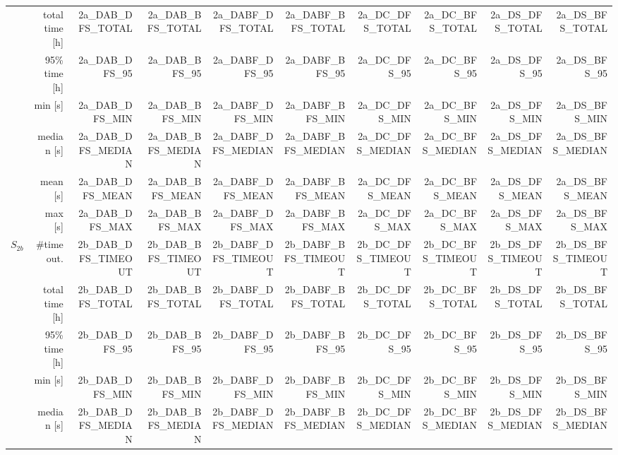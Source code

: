 \begin{table}
{\begin{tabular}{|l|r|r|r|r|r|r|r|r|r|}
                      & total time [h] & 2a_DAB_DFS_TOTAL   & 2a_DAB_BFS_TOTAL   & 2a_DABF_DFS_TOTAL   & 2a_DABF_BFS_TOTAL   & 2a_DC_DFS_TOTAL   & 2a_DC_BFS_TOTAL   & 2a_DS_DFS_TOTAL   & 2a_DS_BFS_TOTAL    \\
                      & 95\% time [h]  & 2a_DAB_DFS_95      & 2a_DAB_BFS_95      & 2a_DABF_DFS_95      & 2a_DABF_BFS_95      & 2a_DC_DFS_95      & 2a_DC_BFS_95      & 2a_DS_DFS_95      & 2a_DS_BFS_95       \\ 
\cline{2-10}
                      & min [s]        & 2a_DAB_DFS_MIN     & 2a_DAB_BFS_MIN     & 2a_DABF_DFS_MIN     & 2a_DABF_BFS_MIN     & 2a_DC_DFS_MIN     & 2a_DC_BFS_MIN     & 2a_DS_DFS_MIN     & 2a_DS_BFS_MIN       \\
                      & median [s]     & 2a_DAB_DFS_MEDIAN  & 2a_DAB_BFS_MEDIAN  & 2a_DABF_DFS_MEDIAN  & 2a_DABF_BFS_MEDIAN  & 2a_DC_DFS_MEDIAN  & 2a_DC_BFS_MEDIAN  & 2a_DS_DFS_MEDIAN  & 2a_DS_BFS_MEDIAN       \\
                      & mean [s]       & 2a_DAB_DFS_MEAN    & 2a_DAB_BFS_MEAN    & 2a_DABF_DFS_MEAN    & 2a_DABF_BFS_MEAN    & 2a_DC_DFS_MEAN    & 2a_DC_BFS_MEAN    & 2a_DS_DFS_MEAN    & 2a_DS_BFS_MEAN       \\
                      & max [s]        & 2a_DAB_DFS_MAX     & 2a_DAB_BFS_MAX     & 2a_DABF_DFS_MAX     & 2a_DABF_BFS_MAX     & 2a_DC_DFS_MAX     & 2a_DC_BFS_MAX     & 2a_DS_DFS_MAX     & 2a_DS_BFS_MAX       \\
\hline
\hline
\multirow{7}{*}{\Large{$S_{2b}$}}   & \#timeout. & 2b_DAB_DFS_TIMEOUT & 2b_DAB_BFS_TIMEOUT & 2b_DABF_DFS_TIMEOUT & 2b_DABF_BFS_TIMEOUT & 2b_DC_DFS_TIMEOUT & 2b_DC_BFS_TIMEOUT & 2b_DS_DFS_TIMEOUT & 2b_DS_BFS_TIMEOUT  \\
                      & total time [h] & 2b_DAB_DFS_TOTAL   & 2b_DAB_BFS_TOTAL   & 2b_DABF_DFS_TOTAL   & 2b_DABF_BFS_TOTAL   & 2b_DC_DFS_TOTAL   & 2b_DC_BFS_TOTAL   & 2b_DS_DFS_TOTAL   & 2b_DS_BFS_TOTAL    \\
                      & 95\% time [h]  & 2b_DAB_DFS_95      & 2b_DAB_BFS_95      & 2b_DABF_DFS_95      & 2b_DABF_BFS_95      & 2b_DC_DFS_95      & 2b_DC_BFS_95      & 2b_DS_DFS_95      & 2b_DS_BFS_95       \\ 
\cline{2-10}
                      & min [s]        & 2b_DAB_DFS_MIN     & 2b_DAB_BFS_MIN     & 2b_DABF_DFS_MIN     & 2b_DABF_BFS_MIN     & 2b_DC_DFS_MIN     & 2b_DC_BFS_MIN     & 2b_DS_DFS_MIN     & 2b_DS_BFS_MIN       \\
                      & median [s]     & 2b_DAB_DFS_MEDIAN  & 2b_DAB_BFS_MEDIAN  & 2b_DABF_DFS_MEDIAN  & 2b_DABF_BFS_MEDIAN  & 2b_DC_DFS_MEDIAN  & 2b_DC_BFS_MEDIAN  & 2b_DS_DFS_MEDIAN  & 2b_DS_BFS_MEDIAN       \\

\end{tabular}}
\end{table}
